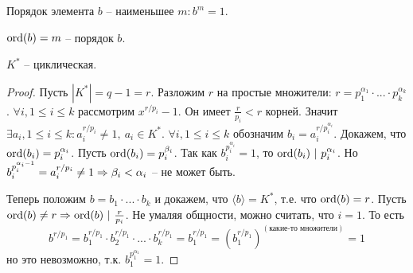 \begin{Def}
	Порядок элемента $b$ -- наименьшее $m : b^m = 1$.
\end{Def}

\begin{notation}
	$\operatorname{ord} (b) = m$ -- порядок $b$. 
\end{notation}

\begin{Thm}
	$K^*$ -- циклическая.
\end{Thm}

\begin{proof}
	Пусть $|K^*| = q - 1 = r$. Разложим $r$ на простые множители: $r = p_1^{\alpha_1} \cdot ... \cdot p_k^{\alpha_k}$.
	$\forall i, 1 \leqslant i \leqslant k$ рассмотрим $x^{r / p_i} - 1$. Он имеет $\frac{r}{p_i} < r$ корней. Значит $\exists a_i, 1 \leqslant i \leqslant k : a_i^{r / p_i} \neq 1, \ a_i \in K^*$.
	$\forall i, 1 \leqslant i \leqslant k$ обозначим $b_i = a_i^{r / p_i^{\alpha_i}}$.
	Докажем, что $\operatorname{ord} (b_i) = p_i^{\alpha_i}$. Пусть $\operatorname{ord} (b_i) = p_i^{\beta_i}$. Так как $b_i^{p_i^{\alpha_i}} = 1$, то $\operatorname{ord}(b_i) \ | \ p_i^{\alpha_i}$. 
	Но $b_i^{p_i^{\alpha_i - 1}} = a_i^{r / p_i} \neq 1 \Rightarrow \beta_i < \alpha_i$ -- не может быть.
	
	Теперь положим $b = b_1 \cdot ... \cdot b_k$ и докажем, что $\langle b\rangle = K^*$, т.е. что $\operatorname{ord}(b) = r$. 
	Пусть $\Ord(b) \neq r \SO \Ord(b) \ | \ \frac{r}{p_i}$. Не умаляя общности, можно считать, что $i = 1$.
	То есть 
	\[b^{r / p_1} = b_1^{r / p_1} \cdot b_2^{r / p_1} \cdot ... \cdot b_k^{r / p_1} = b_1^{r / p_1} = \left(b_1^{r / p_1}\right)^{(\text{какие-то множители})} = 1\]
	но это невозможно, т.к. $b_1^{p_1^{\alpha_1}} = 1$. 
\end{proof}

